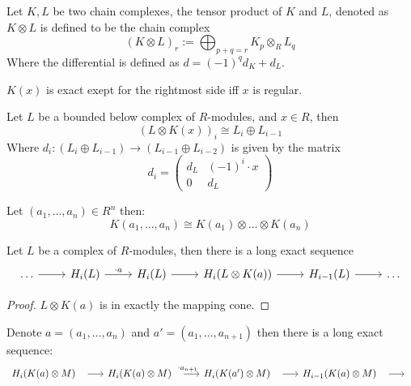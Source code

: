 \begin{definition}
\begin{definition}
	\label{def:complex_tensor_product}
	Let $K, L$ be two chain complexes, the tensor product of $K$ and $L$, denoted as $K \otimes L$ is defined to be the chain complex
	$$(K \otimes L)_r := \bigoplus_{p + q = r}K_p \otimes_R L_q$$
	Where the differential is defined as $d = (-1)^q d_K + d_L$.
\end{definition}

\begin{lemma}
	\label{lem:koszul_of_length_2}
	$K(x)$ is exact exept for the rightmost side iff $x$ is regular.
\end{lemma}

\begin{lemma}
	\label{lem:koszul_tensor_as_mapping_cone}
	Let $L$ be a bounded below complex of $R$-modules, and $x \in R$, then
	$$(L \otimes K(x))_i \cong L_i \oplus L_{i-1}$$
	Where $d_i: (L_i \oplus L_{i-1}) \to (L_{i-1}\oplus L_{i-2})$ is given by the matrix
	$$d_i = \begin{pmatrix}d_L & (-1)^i \cdot x \\ 0 & d_L\end{pmatrix}$$
\end{lemma}

\begin{theorem}
	\label{thm:long_koszul_build_by_tensoring}
	Let $(a_1, \dots, a_n) \in R^n$ then:
	$$K(a_1, \dots, a_n) \cong K(a_1) \otimes \dots \otimes K(a_n)$$
\end{theorem}

\begin{lemma}
	\label{lem:koszul_induces_long_exact_seq}
	Let $L$ be a complex of $R$-modules, then there is a long exact sequence
\[\begin{tikzcd}
	\dots & {H_i(L)} & {H_i(L)} & {H_i(L\otimes K(a))} & {H_{i-1}(L)} & \dots
	\arrow[from=1-1, to=1-2]
	\arrow["{\cdot a}", from=1-2, to=1-3]
	\arrow[from=1-3, to=1-4]
	\arrow[from=1-4, to=1-5]
	\arrow[from=1-5, to=1-6]
\end{tikzcd}\]
\end{lemma}

\begin{proof}
	$L \otimes K(a)$ is in exactly the mapping cone.
\end{proof}

\begin{corollary}
	\label{cor:tensor_koszul_induced_long_exact_seq}
	Denote $a = (a_1, \dots, a_n)$ and $a' = (a_1, \dots, a_{n+1})$ then there is a long exact sequence:
\[\begin{tikzcd}
	{H_i(K(a) \otimes M)} & {H_i(K(a) \otimes M)} & {H_i(K(a') \otimes M)} & {H_{i-1}(K(a) \otimes M)} & 
	\arrow[shorten <=8pt, from=1-1, to=1-2]
	\arrow[shorten <=8pt, "{\cdot a_{n+1}}", from=1-2, to=1-3]
	\arrow[shorten <=8pt, from=1-3, to=1-4]
	\arrow[shorten <=8pt, from=1-4, to=1-5]
\end{tikzcd}\]
\end{corollary}


\end{definition}

